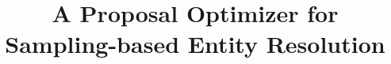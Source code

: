 \documentclass{vldb}
\title{A Proposal Optimizer for Sampling-based Entity Resolution}
\author{\alignauthor{Christan Earl Grant}\\
    \affaddr{University of Florida}\\
    \affaddr{Dept.\ of Computer Science}\\
    \affaddr{Gainesville, Florida, USA} \\
    \email{cgrant@cise.ufl.edu}\\
\alignauthor{Daisy Zhe Wang}\\
    \affaddr{University of Florida}\\
    \affaddr{Dept.\ of Computer Science}\\
    \affaddr{Gainesville, Florida, USA}\\
    \email{daisyw@cise.ufl.edu}\\
}
\begin{document}
\maketitle



















{%
  \scriptsize%
  
  
}
\end{document}
